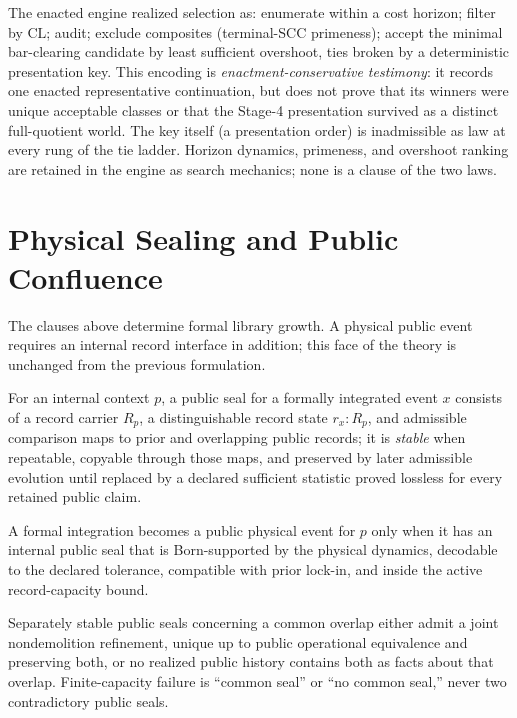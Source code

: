 The enacted engine realized selection as: enumerate within a cost horizon;
filter by \(\mathrm{CL}\); audit; exclude composites (terminal-SCC
primeness); accept the minimal bar-clearing candidate by least sufficient
overshoot, ties broken by a deterministic presentation key. This encoding is
\emph{enactment-conservative testimony}: it records one enacted
representative continuation, but does not prove that its winners were unique
acceptable classes or that the Stage-4 presentation survived as a distinct
full-quotient world. The key itself (a presentation order) is inadmissible as
law at every rung of the tie ladder. Horizon dynamics,
primeness, and overshoot ranking are retained in the engine as search
mechanics; none is a clause of the two laws.

\section{Physical Sealing and Public Confluence}

The clauses above determine formal library growth. A physical public event
requires an internal record interface in addition; this face of the theory is
unchanged from the previous formulation.

\begin{definition}
For an internal context \(p\), a public seal for a formally integrated event
\(x\) consists of a record carrier \(R_p\), a distinguishable record state
\(r_x:R_p\), and admissible comparison maps to prior and overlapping public
records; it is \emph{stable} when repeatable, copyable through those maps, and
preserved by later admissible evolution until replaced by a declared
sufficient statistic proved lossless for every retained public claim.
\end{definition}

\begin{definition}
A formal integration becomes a public physical event for \(p\) only when it
has an internal public seal that is Born-supported by the physical dynamics,
decodable to the declared tolerance, compatible with prior lock-in, and
inside the active record-capacity bound.
\end{definition}

\begin{definition}
Separately stable public seals concerning a common overlap either admit a
joint nondemolition refinement, unique up to public operational equivalence
and preserving both, or no realized public history contains both as facts
about that overlap. Finite-capacity failure is ``common seal'' or ``no common
seal,'' never two contradictory public seals.
\end{definition}

